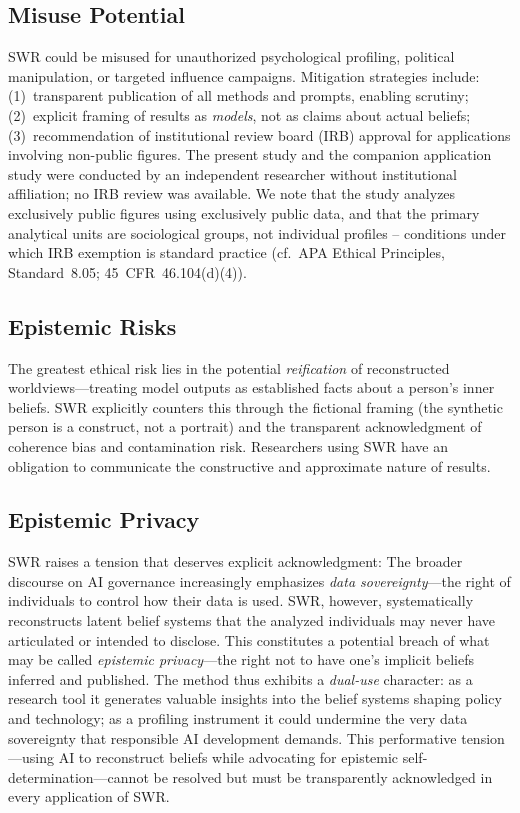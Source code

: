 \documentclass[11pt,a4paper]{article}
\theoremstyle{definition}
\theoremstyle{plain}
\theoremstyle{remark}
\begin{document}
\subsection{Misuse Potential}

SWR could be misused for unauthorized psychological profiling, political manipulation, or targeted influence campaigns. Mitigation strategies include: (1)~transparent publication of all methods and prompts, enabling scrutiny; (2)~explicit framing of results as \emph{models}, not as claims about actual beliefs; (3)~recommendation of institutional review board (IRB) approval for applications involving non-public figures. The present study and the companion application study were conducted by an independent researcher without institutional affiliation; no IRB review was available. We note that the study analyzes exclusively public figures using exclusively public data, and that the primary analytical units are sociological groups, not individual profiles -- conditions under which IRB exemption is standard practice (cf.\ APA Ethical Principles, Standard~8.05; 45~CFR~46.104(d)(4)).

\subsection{Epistemic Risks}

The greatest ethical risk lies in the potential \emph{reification} of reconstructed worldviews---treating model outputs as established facts about a person's inner beliefs. SWR explicitly counters this through the fictional framing (the synthetic person is a construct, not a portrait) and the transparent acknowledgment of coherence bias and contamination risk. Researchers using SWR have an obligation to communicate the constructive and approximate nature of results.

\subsection{Epistemic Privacy}

SWR raises a tension that deserves explicit acknowledgment: The broader discourse on AI governance increasingly emphasizes \emph{data sovereignty}---the right of individuals to control how their data is used. SWR, however, systematically reconstructs latent belief systems that the analyzed individuals may never have articulated or intended to disclose. This constitutes a potential breach of what may be called \emph{epistemic privacy}---the right not to have one's implicit beliefs inferred and published. The method thus exhibits a \emph{dual-use} character: as a research tool it generates valuable insights into the belief systems shaping policy and technology; as a profiling instrument it could undermine the very data sovereignty that responsible AI development demands. This performative tension---using AI to reconstruct beliefs while advocating for epistemic self-determination---cannot be resolved but must be transparently acknowledged in every application of SWR.
\end{document}
